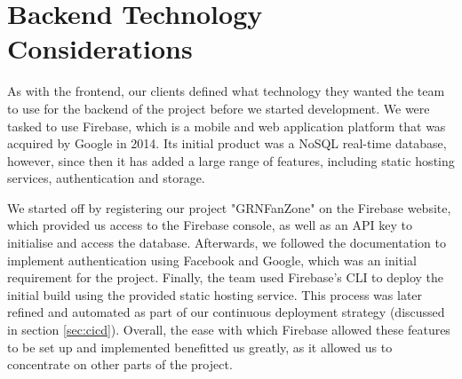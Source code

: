 \documentclass{l3proj}
\begin{document}


\section{Backend Technology Considerations} %
\label{sec:backend}

As with the frontend, our clients defined what technology they wanted the team
 to use for the backend of the project before we started development. We were
 tasked to use Firebase, which is a mobile and web application platform that
 was acquired by Google in 2014. Its initial product was a NoSQL real-time database,
 however, since then it has added a large range of features, including static
 hosting services, authentication and storage.

We started off by registering our project "GRNFanZone" on the Firebase website,
 which provided us access to the Firebase console, as well as an API key to
 initialise and access the database. Afterwards, we followed the documentation
 to implement authentication using Facebook and Google, which was an initial
 requirement for the project. Finally, the team used Firebase's CLI to deploy
 the initial build using the provided static hosting service. This process
 was later refined and automated as part of our continuous deployment strategy
 (discussed in section \ref{sec:cicd}). Overall, the ease with which Firebase
 allowed these features to be set up and implemented benefitted us greatly,
 as it allowed us to concentrate on other parts of the project.
\end{document}
